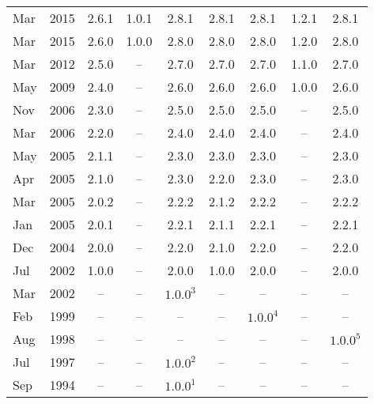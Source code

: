 \begin{xtabular}{|ll|c|c|c|c|c|c|c|}
Mar & 2015 & 2.6.1       & 1.0.1       & 2.8.1         & 2.8.1       & 2.8.1       & 1.2.1       & 2.8.1\\
Mar & 2015 & 2.6.0       & 1.0.0       & 2.8.0         & 2.8.0       & 2.8.0       & 1.2.0       & 2.8.0\\
Mar & 2012 & 2.5.0       & --          & 2.7.0         & 2.7.0       & 2.7.0       & 1.1.0       & 2.7.0\\
May & 2009 & 2.4.0       & --          & 2.6.0         & 2.6.0       & 2.6.0       & 1.0.0       & 2.6.0\\
Nov & 2006 & 2.3.0       & --          & 2.5.0         & 2.5.0       & 2.5.0       & --          & 2.5.0\\
Mar & 2006 & 2.2.0       & --          & 2.4.0         & 2.4.0       & 2.4.0       & --          & 2.4.0\\
May & 2005 & 2.1.1       & --          & 2.3.0         & 2.3.0       & 2.3.0       & --          & 2.3.0\\
Apr & 2005 & 2.1.0       & --          & 2.3.0         & 2.2.0       & 2.3.0       & --          & 2.3.0\\
Mar & 2005 & 2.0.2       & --          & 2.2.2         & 2.1.2       & 2.2.2       & --          & 2.2.2\\
Jan & 2005 & 2.0.1       & --          & 2.2.1         & 2.1.1       & 2.2.1       & --          & 2.2.1\\
Dec & 2004 & 2.0.0       & --          & 2.2.0         & 2.1.0       & 2.2.0       & --          & 2.2.0\\
Jul & 2002 & 1.0.0       & --          & 2.0.0         & 1.0.0       & 2.0.0       & --          & 2.0.0\\
Mar & 2002 & --          & --          & $1.0.0^3$     & --          & --          & --          & --\\
Feb & 1999 & --          & --          & --            & --          & $1.0.0^4$   & --          & --\\
Aug & 1998 & --          & --          & --            & --          & --          & --          & $1.0.0^5$\\
Jul & 1997 & --          & --          & $1.0.0^2$     & --          & --          & --          & --\\
Sep & 1994 & --          & --          & $1.0.0^1$     & --          & --          & --          & --\\
\end{xtabular}
